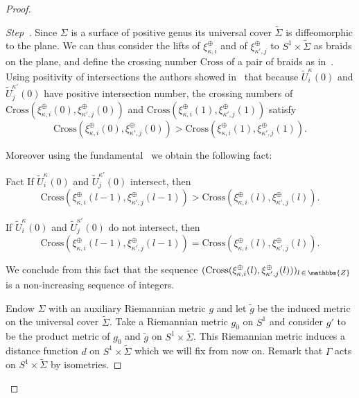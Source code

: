 \documentclass[AHL,Unicode,longabstracts,published]{cedram}
\newcommand{\Z}{\mathbbm{Z}}
\newcommand{\Cross}{\mathrm{Cross}}
\newcounter{stepcount}
\newenvironment{step}{\refstepcounter{stepcount}\begin{proof}[Step~\thestepcount]}{\let\qed\relax\end{proof}}
\begin{document}
\begin{proof}
\begin{step}\label{step3.2}
Since $\Sigma$ is a surface of positive genus its universal cover $\widetilde{\Sigma}$ is diffeomorphic to the plane. We can thus consider the lifts of $\xi^{\oplus}_{\kappa,i}$ and of $\xi^{\oplus}_{\kappa',j}$ to $S^1 \times \widetilde{\Sigma}$ as braids on the plane, and define the crossing number $\Cross$ of a pair of braids as in~\cite[Section~5]{BraidFloer}. Using positivity of intersections the authors showed in~\cite[Lemma~5.4]{BraidFloer} that because $\widetilde{U}^\kappa_i(0)$ and $\widetilde{U}^{\kappa'}_j(0)$ have positive intersection number, the crossing numbers of $\Cross(\xi^{\oplus}_{\kappa,i}(0),\xi^{\oplus}_{\kappa',j}(0))$ and $\Cross(\xi^{\oplus}_{\kappa,i}(1),\xi^{\oplus}_{\kappa',j}(1))$ satisfy
\begin{equation}\label{eq:crossing1}
\Cross\left(\xi^{\oplus}_{\kappa,i}(0),\xi^{\oplus}_{\kappa',j}(0)\right) > \Cross\left(\xi^{\oplus}_{\kappa,i}(1),\xi^{\oplus}_{\kappa',j}(1)\right).
\end{equation}

Moreover using the fundamental~\cite[Lemma~5.4]{BraidFloer} we obtain the following fact:

\begin{enonce}{Fact} \label{factCross}
If $\widetilde{U}^\kappa_i(0)$ and $\widetilde{U}^{\kappa'}_j(0)$ intersect, then
\[
\Cross\left(\xi^{\oplus}_{\kappa,i}(l-1),\xi^{\oplus}_{\kappa',j}(l-1)\right) > \Cross\left(\xi^{\oplus}_{\kappa,i}(l),\xi^{\oplus}_{\kappa',j}(l)\right).
\]

If $\widetilde{U}^\kappa_i(0)$ and $\widetilde{U}^{\kappa'}_j(0)$ do not intersect, then
\[
\Cross\left(\xi^{\oplus}_{\kappa,i}(l-1),\xi^{\oplus}_{\kappa',j}(l-1)\right) = \Cross\left(\xi^{\oplus}_{\kappa,i}(l),\xi^{\oplus}_{\kappa',j}(l)\right).
\]
\end{enonce}

We conclude from this fact that the sequence $(\Cross(\xi^{\oplus}_{\kappa,i}(l),\xi^{\oplus}_{\kappa',j}(l)))_{l\,\in\,\Z}$ is a non-increasing sequence of integers.



Endow $\Sigma$ with an auxiliary Riemannian metric $g$ and let $\widetilde{g}$ be the induced metric on the universal cover $\widetilde{\Sigma}$. Take a Riemannian metric $g_0$ on $S^1$ and consider $g'$ to be the product metric of $g_0$ and $\widetilde{g}$ on $S^1 \times \widetilde{\Sigma}$. This Riemannian metric induces a distance function $d$ on $S^1 \times \widetilde{\Sigma}$ which we will fix from now on. Remark that $\Gamma$ acts on $S^1 \times \widetilde{\Sigma}$ by isometries.


\end{step}
\end{proof}
\end{document}

